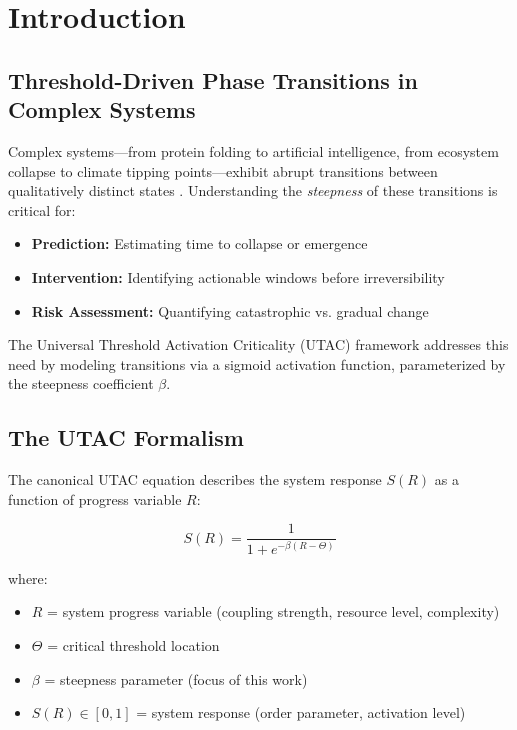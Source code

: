 \documentclass[11pt,a4paper]{article}
\begin{document}
\tableofcontents
\newpage

\section{Introduction}

\subsection{Threshold-Driven Phase Transitions in Complex Systems}

Complex systems—from protein folding to artificial intelligence, from ecosystem collapse to climate tipping points—exhibit abrupt transitions between qualitatively distinct states \cite{Scheffer2009,Lenton2011,Bak1987,Sethna2006}. Understanding the \textit{steepness} of these transitions is critical for:

\begin{itemize}
\item \textbf{Prediction:} Estimating time to collapse or emergence
\item \textbf{Intervention:} Identifying actionable windows before irreversibility
\item \textbf{Risk Assessment:} Quantifying catastrophic vs. gradual change
\end{itemize}

The Universal Threshold Activation Criticality (UTAC) framework addresses this need by modeling transitions via a sigmoid activation function, parameterized by the steepness coefficient $\beta$.

\subsection{The UTAC Formalism}

The canonical UTAC equation describes the system response $S(R)$ as a function of progress variable $R$:

\begin{equation}
S(R) = \frac{1}{1 + e^{-\beta(R - \Theta)}}
\label{eq:utac}
\end{equation}

where:
\begin{itemize}
\item $R$ = system progress variable (coupling strength, resource level, complexity)
\item $\Theta$ = critical threshold location
\item $\beta$ = steepness parameter (focus of this work)
\item $S(R) \in [0,1]$ = system response (order parameter, activation level)
\end{itemize}
\end{document}
